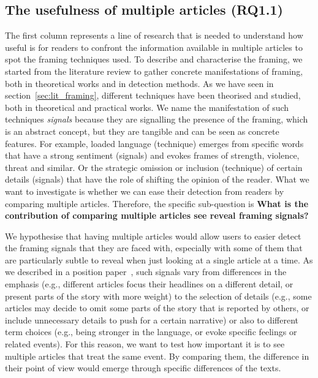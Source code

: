 

\subsection{The usefulness of multiple articles (RQ1.1)}
The first column represents a line of research that is needed to understand how useful is for readers to confront the information available in multiple articles to spot the framing techniques used.
To describe and characterise the framing, we started from the literature review to gather concrete manifestations of framing, both in theoretical works and in detection methods.
As we have seen in section~\ref{sec:lit_framing}, different techniques have been theorised and studied, both in theoretical and practical works.
We name the manifestation of such techniques \emph{signals} because they are signalling the presence of the framing, which is an abstract concept, but they are tangible and can be seen as concrete features.
For example, loaded language (technique) emerges from specific words that have a strong sentiment (signals) and evokes frames of strength, violence, threat and similar.
Or the strategic omission or inclusion (technique) of certain details (signals) that have the role of shifting the opinion of the reader.
What we want to investigate is whether we can ease their detection from readers by comparing multiple articles. 
Therefore, the specific sub-question is \textbf{What is the contribution of comparing multiple articles see reveal framing signals?}

We hypothesise that having multiple articles would allow users to easier detect the framing signals that they are faced with, especially with some of them that are particularly subtle to reveal when just looking at a single article at a time.
As we described in a position paper~\cite{mensio2020towards}, such signals vary from differences in the emphasis (e.g., different articles focus their headlines on a different detail, or present parts of the story with more weight) to the selection of details (e.g., some articles may decide to omit some parts of the story that is reported by others, or include unnecessary details to push for a certain narrative) or also to different term choices (e.g., being stronger in the language, or evoke specific feelings or related events).
For this reason, we want to test how important it is to see multiple articles that treat the same event.
By comparing them, the difference in their point of view would emerge through specific differences of the texts.

